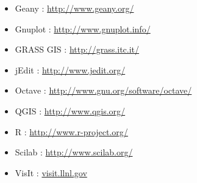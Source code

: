 \begin{itemize}
  \item Geany : \textcolor{blue}{\url{http://www.geany.org/}}
  \item Gnuplot : \textcolor{blue}{\url{http://www.gnuplot.info/}}
  \item GRASS GIS : \textcolor{blue}{\url{http://grass.itc.it/}}
  \item jEdit : \textcolor{blue}{\url{http://www.jedit.org/}}
  \item Octave : \textcolor{blue}{\url{http://www.gnu.org/software/octave/}}
  \item QGIS : \textcolor{blue}{\url{http://www.qgis.org/}}
  \item R : \textcolor{blue}{\url{http://www.r-project.org/}}
  \item Scilab : \textcolor{blue}{\url{http://www.scilab.org/}}
  \item VisIt : \textcolor{blue}{\url{visit.llnl.gov}} 
\end{itemize}   

